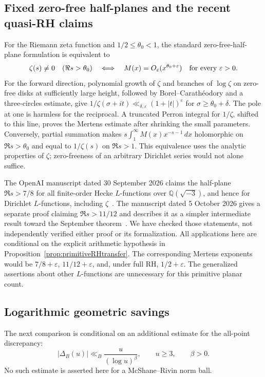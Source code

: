 \documentclass[11pt,a4paper]{article}
\numberwithin{equation}{section}
\theoremstyle{definition}
\theoremstyle{remark}
\begin{document}
\subsection{Fixed zero-free half-planes and the recent quasi-RH claims}
\label{subsec:quasiRHapplication}

For the Riemann zeta function and $1/2\le\theta_0<1$, the standard
zero-free-half-plane formulation is equivalent to
\begin{equation}
 \zeta(s)\ne0\quad(\Re s>\theta_0)
 \quad\Longleftrightarrow\quad
 M(x)=O_\varepsilon(x^{\theta_0+\varepsilon})
 \quad\hbox{for every }\varepsilon>0.
 \label{eq:zeroFreeMertens}
\end{equation}
For the forward direction, polynomial growth of $\zeta$ and branches of
$\log\zeta$ on zero-free disks at sufficiently large height, followed by
Borel--Carath\'eodory and a
three-circles estimate, give
$1/\zeta(\sigma+it)\ll_{\delta,\varepsilon}(1+|t|)^\varepsilon$
for $\sigma\ge\theta_0+\delta$. The pole at one is harmless for the
reciprocal. A truncated Perron integral for $1/\zeta$, shifted to this
line, proves the Mertens estimate after shrinking the small parameters.
Conversely, partial summation makes
$s\int_1^\infty M(x)x^{-s-1}\,dx$ holomorphic on
$\Re s>\theta_0$ and equal to $1/\zeta(s)$ on $\Re s>1$.
This equivalence uses the analytic properties of $\zeta$; zero-freeness
of an arbitrary Dirichlet series would not alone suffice.

The OpenAI manuscript dated 30 September 2026 claims the half-plane
$\Re s>7/8$ for all finite-order Hecke $L$-functions over
$\mathbb Q(\sqrt{-3})$, and hence for Dirichlet $L$-functions,
including $\zeta$~\cite[Theorem~1.1]{OpenAIQuasiRHSeptember}.
The manuscript dated 5 October 2026 gives a separate proof claiming
$\Re s>11/12$ and describes it as a simpler intermediate result toward
the September theorem~\cite[Theorem~1.1 and the following paragraph]{OpenAIQuasiRHOctober}.
We have checked those statements, not independently verified either
proof or its formalization. All applications here are conditional on
the explicit arithmetic hypothesis in Proposition~\ref{prop:primitiveRHtransfer}.
The corresponding Mertens exponents would be $7/8+\varepsilon$,
$11/12+\varepsilon$, and, under full RH, $1/2+\varepsilon$.
The generalized assertions about other $L$-functions are unnecessary
for this primitive planar count.

\subsection{Logarithmic geometric savings}
The next comparison is conditional on an additional estimate for the
all-point discrepancy:
\begin{equation}\label{eq:primitiveRHgeometry}
 |\Delta_B(u)|\ll_B\frac{u}{(\log u)^\beta},\qquad u\ge3,
 \qquad\beta>0.
\end{equation}
No such estimate is asserted here for a McShane--Rivin norm ball.
\end{document}
